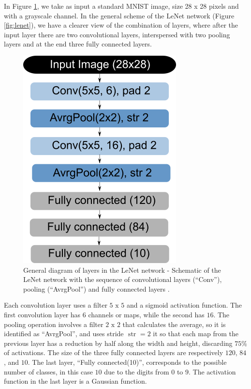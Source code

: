 In Figure \ref{fig:lenet2}, we take as input a standard MNIST image, size 28 x 28 pixels and with a grayscale channel. In the general scheme of the LeNet network (Figure \ref{fig:lenet}), we have a clearer view of the combination of layers, where after the input layer there are two convolutional layers, interspersed with two pooling layers and at the end three fully connected layers.

\begin{figure}
    \centering
    \includegraphics[scale=0.4]{"Part 3 - Learning Systems/Supervised Learning/Deep Learning/images/figure126.png"}
    \caption{ General diagram of layers in the LeNet network - Schematic of the LeNet network with the sequence of convolutional layers (“Conv”), pooling (“AvrgPool”) and fully connected layers \cite{zhang2020dive}.}
    \label{fig:lenet2}
\end{figure}

Each convolution layer uses a filter $5 \text{ x } 5$ and a sigmoid activation function. The first convolution layer has $6$ channels or maps, while the second has $16$. The pooling operation involves a filter $2 \text{ x } 2$ that calculates the average, so it is identified as “AvrgPool”, and uses stride $\text{ str }=2$ it so that each map from the previous layer has a reduction by half along the width and height, discarding $75\%$ of activations. The size of the three fully connected layers are respectively $120$, $84$, and $10$. The last layer, “Fully connected(10)”, corresponds to the possible number of classes, in this case $10$ due to the digits from $0$ to $9$. The activation function in the last layer is a Gaussian function.

